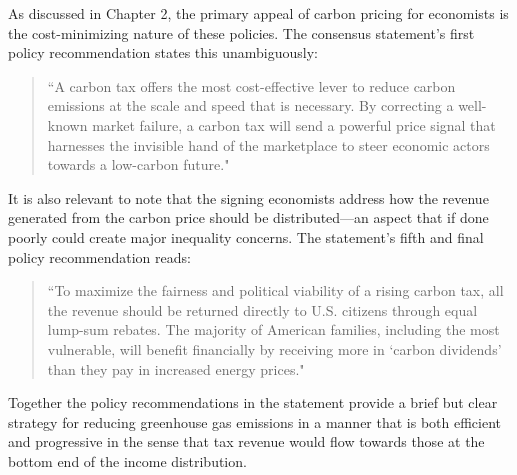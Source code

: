 As discussed in Chapter 2, the primary appeal of carbon pricing for economists is the cost-minimizing nature of these policies. The consensus statement's first policy recommendation states this unambiguously:
\begin{quote}
    ``A carbon tax offers the most cost-effective lever to reduce carbon emissions at the scale and speed that is necessary. By correcting a well-known market failure, a carbon tax will send a powerful price signal that harnesses the invisible hand of the marketplace to steer economic actors towards a low-carbon future." 
\end{quote}




It is also relevant to note that the signing economists address how the revenue generated from the carbon price should be distributed---an aspect that if done poorly could create major inequality concerns. The statement's fifth and final policy recommendation reads: 
\begin{quote}
    ``To maximize the fairness and political viability of a rising carbon tax, all the revenue should be returned directly to U.S. citizens through equal lump-sum rebates. The majority of American families, including the most vulnerable, will benefit financially by receiving more in `carbon dividends' than they pay in increased energy prices."
\end{quote}
Together the policy recommendations in the statement provide a brief but clear strategy for reducing greenhouse gas emissions in a manner that is both efficient and progressive in the sense that tax revenue would flow towards those at the bottom end of the income distribution. 

